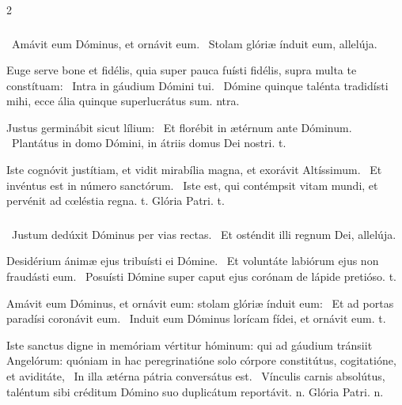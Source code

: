 \documentclass[9pt,twoside]{extarticle}
\begin{document}
\begin{multicols}{2}
\subsubsection*{}
\begin{tightlist}{}
\item {}~Amávit eum Dóminus, et ornávit eum. ~Stolam glóriæ índuit eum, allelúja.
\item {} Euge serve bone et fidélis, quia super pauca fuísti fidélis, supra multa te constítuam: \textred{*}~Intra in gáudium Dómini tui. ~Dómine quinque talénta tradidísti mihi, ecce ália quinque superlucrátus sum. ntra.
\item {} Justus germinábit sicut lílium: \textred{*}~Et florébit in ætérnum ante Dóminum. ~Plantátus in domo Dómini, in átriis domus Dei nostri. t.
\item {} Iste cognóvit justítiam, et vidit mirabília magna, et exorávit Altíssimum. \textred{*}~Et invéntus est in número sanctórum. ~Iste est, qui contémpsit vitam mundi, et pervénit ad cœléstia regna. t. Glória Patri. t.
\end{tightlist}

\subsubsection*{}
\begin{tightlist}{}
\item {}~Justum dedúxit Dóminus per vias rectas. ~Et osténdit illi regnum Dei, allelúja. 
\item {} Desidérium ánimæ ejus tribuísti ei Dómine. \textred{*}~Et voluntáte labiórum ejus non fraudásti eum. ~Posuísti Dómine super caput ejus corónam de lápide pretióso. t.
\item {} Amávit eum Dóminus, et ornávit eum: stolam glóriæ índuit eum: \textred{*}~Et ad portas paradísi coronávit eum. ~Induit eum Dóminus lorícam fídei, et ornávit eum. t.
\item {} Iste sanctus digne in memóriam vértitur hóminum: qui ad gáudium tránsiit Angelórum: quóniam in hac peregrinatióne solo córpore constitútus, cogitatióne, et aviditáte, \textred{*}~In illa ætérna pátria conversátus est. ~Vínculis carnis absolútus, taléntum sibi créditum Dómino suo duplicátum reportávit. n. Glória Patri. n.
\end{tightlist}


\end{multicols}
\end{document}

